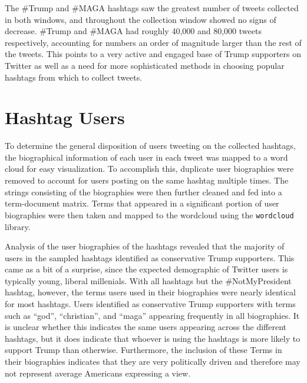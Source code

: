 \documentclass[prodmode]{acmsmall} %
\begin{document}
The \#Trump and \#MAGA hashtags saw the greatest number of tweets collected in
both windows, and throughout the collection window showed no signs of decrease.
\#Trump and \#MAGA had roughly 40,000 and 80,000 tweets respectively,
accounting for numbers an order of magnitude larger than the rest of the tweets.
This points to a very active and engaged base of Trump supporters on Twitter as
well as a need for more sophisticated methods in choosing popular hashtags from
which to collect tweets.

\section{Hashtag Users}
To determine the general disposition of users tweeting on the collected
hashtags, the biographical information of each user in each tweet was mapped to
a word cloud for easy visualization. To accomplish this, duplicate user
biographies were removed to account for users posting on the same hashtag
multiple times. The strings consisting of the biographies were then further
cleaned and fed into a term-document matrix. Terms that appeared in a
significant portion of user biographies were then taken and mapped to the
wordcloud using the \verb|wordcloud| library.

Analysis of the user biographies of the hashtags revealed that the majority of
users in the sampled hashtags identified as conservative Trump supporters. This
came as a bit of a surprise, since the expected demographic of Twitter users is
typically young, liberal millenials. With all hashtags but the \#NotMyPresident
hashtag, however, the terms users used in their biographies were nearly
identical for most hashtags. Users identified as conservative Trump supporters
with terms such as ``god'', ``christian'', and ``maga'' appearing frequently in
all biographies. It is unclear whether this indicates the same users appearing
across the different hashtags, but it does indicate that whoever is using the
hashtags is more likely to support Trump than otherwise. Furthermore, the
inclusion of these Terms in their biographies indicates that they are very
politically driven and therefore may not represent average Americans expressing
a view.
\end{document}
